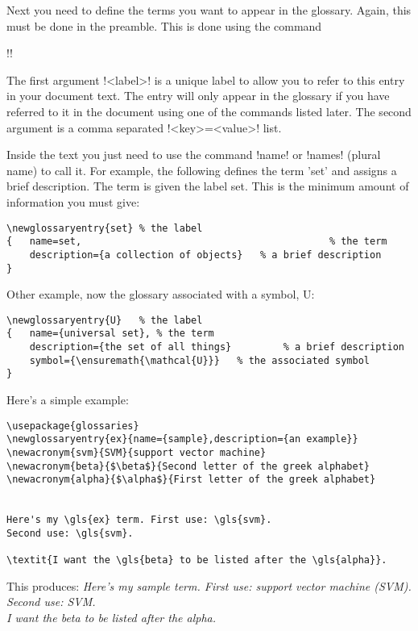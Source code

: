 Next you need to define the terms you want to appear in the glossary. Again, this must be done in the preamble. This is done using the command

\spverb!!

The first argument \spverb!<label>! is a unique label to allow you to refer to this entry in your document text. The entry will only appear in the glossary if you have referred to it in the document using one of the commands listed later. The second argument is a comma separated \spverb!<key>=<value>! list.

Inside the text you just need to use the command \spverb!\gls{name}! or \spverb!\glspl{name}! (plural name) to call it. For example, the following defines the term 'set' and assigns a brief description. The term is given the label set. This is the minimum amount of information you must give:

\begin{verbatim}
\newglossaryentry{set} % the label
{	name=set,            								% the term
 	description={a collection of objects} 	% a brief description
}
\end{verbatim}

Other example, now the glossary associated with a symbol, \gls{U}:

\begin{verbatim}
\newglossaryentry{U}   % the label
{	name={universal set}, % the term
 	description={the set of all things} 		% a brief description
 	symbol={\ensuremath{\mathcal{U}}}  	% the associated symbol 
}
\end{verbatim}

Here's a simple example:
\begin{verbatim}
\usepackage{glossaries} 
\newglossaryentry{ex}{name={sample},description={an example}}
\newacronym{svm}{SVM}{support vector machine}
\newacronym{beta}{$\beta$}{Second letter of the greek alphabet}
\newacronym{alpha}{$\alpha$}{First letter of the greek alphabet}


Here's my \gls{ex} term. First use: \gls{svm}. 
Second use: \gls{svm}.

\textit{I want the \gls{beta} to be listed after the \gls{alpha}}.

\end{verbatim}

This produces: \textit{Here's my sample term. First use: support vector machine (SVM).\\ Second use: SVM.\\
I want the \gls{beta} to be listed after the \gls{alpha}.}


